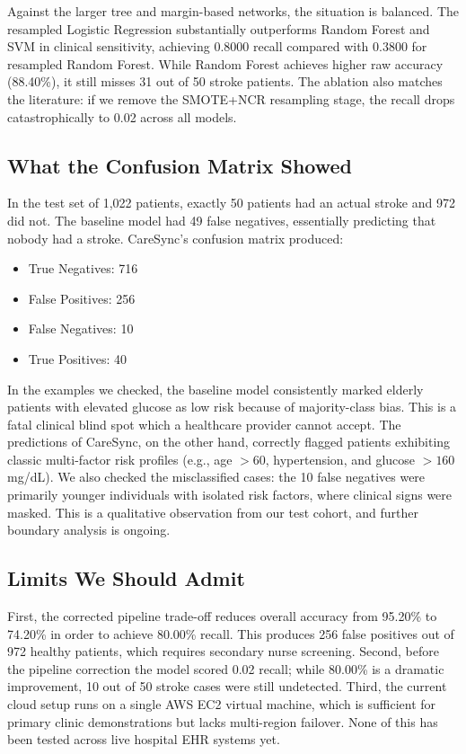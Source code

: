 \documentclass[10pt,twocolumn,a4paper]{article}
\begin{document}
Against the larger tree and margin-based networks, the situation is balanced. The resampled Logistic Regression substantially outperforms Random Forest and SVM in clinical sensitivity, achieving 0.8000 recall compared with 0.3800 for resampled Random Forest. While Random Forest achieves higher raw accuracy (88.40\%), it still misses 31 out of 50 stroke patients. The ablation also matches the literature: if we remove the SMOTE+NCR resampling stage, the recall drops catastrophically to 0.02 across all models.

\subsection{What the Confusion Matrix Showed}
In the test set of 1,022 patients, exactly 50 patients had an actual stroke and 972 did not. The baseline model had 49 false negatives, essentially predicting that nobody had a stroke. CareSync's confusion matrix produced:
\begin{itemize}
    \item True Negatives: 716
    \item False Positives: 256
    \item False Negatives: 10
    \item True Positives: 40
\end{itemize}
In the examples we checked, the baseline model consistently marked elderly patients with elevated glucose as low risk because of majority-class bias. This is a fatal clinical blind spot which a healthcare provider cannot accept. The predictions of CareSync, on the other hand, correctly flagged patients exhibiting classic multi-factor risk profiles (e.g., age $>60$, hypertension, and glucose $>160$\,mg/dL). We also checked the misclassified cases: the 10 false negatives were primarily younger individuals with isolated risk factors, where clinical signs were masked. This is a qualitative observation from our test cohort, and further boundary analysis is ongoing.

\subsection{Limits We Should Admit}
First, the corrected pipeline trade-off reduces overall accuracy from 95.20\% to 74.20\% in order to achieve 80.00\% recall. This produces 256 false positives out of 972 healthy patients, which requires secondary nurse screening. Second, before the pipeline correction the model scored 0.02 recall; while 80.00\% is a dramatic improvement, 10 out of 50 stroke cases were still undetected. Third, the current cloud setup runs on a single AWS EC2 virtual machine, which is sufficient for primary clinic demonstrations but lacks multi-region failover. None of this has been tested across live hospital EHR systems yet.
\end{document}
